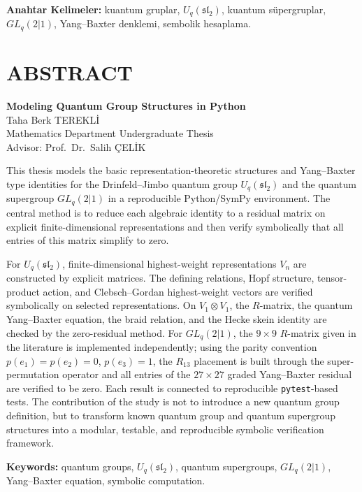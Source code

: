 \documentclass[12pt,a4paper,fleqn]{report}
\numberwithin{equation}{chapter}
\theoremstyle{plain}
\theoremstyle{definition}
\renewcommand{\sl}{\mathfrak{sl}}
\newcommand{\Uq}{U_q(\sl_2)}
\newcommand{\TezBaslikEn}{Modeling Quantum Group Structures in Python}
\newcommand{\Ogrenci}{Taha Berk TEREKLİ}
\newcommand{\Danisman}{Prof.\ Dr.\ Salih ÇELİK}
\begin{document}
\vspace{0.6cm}
\noindent\textbf{Anahtar Kelimeler:} kuantum gruplar, $U_q(\mathfrak{sl}_2)$,
kuantum süpergruplar, $GL_q(2|1)$, Yang--Baxter denklemi, sembolik hesaplama.
\clearpage

\chapter*{ABSTRACT}
\begin{center}
{\bfseries \TezBaslikEn}\\[4pt]
\Ogrenci\\[8pt]
Mathematics Department Undergraduate Thesis\\[6pt]
Advisor: \Danisman\\[10pt]
\end{center}

This thesis models the basic representation-theoretic structures and
Yang--Baxter type identities for the Drinfeld--Jimbo quantum group $\Uq$ and the
quantum supergroup $GL_q(2|1)$ in a reproducible Python/SymPy environment. The
central method is to reduce each algebraic identity to a residual matrix on
explicit finite-dimensional representations and then verify symbolically that
all entries of this matrix simplify to zero.

For $\Uq$, finite-dimensional highest-weight representations $V_n$ are
constructed by explicit matrices. The defining relations, Hopf structure,
tensor-product action, and Clebsch--Gordan highest-weight vectors are verified
symbolically on selected representations. On $V_1\otimes V_1$, the $R$-matrix,
the quantum Yang--Baxter equation, the braid relation, and the Hecke skein
identity are checked by the zero-residual method. For $GL_q(2|1)$, the
$9\times9$ $R$-matrix given in the literature is implemented independently;
using the parity convention $p(e_1)=p(e_2)=0$, $p(e_3)=1$, the $R_{13}$
placement is built through the super-permutation operator and all entries of the
$27\times27$ graded Yang--Baxter residual are verified to be zero. Each result is
connected to reproducible \texttt{pytest}-based tests. The contribution of the
study is not to introduce a new quantum group definition, but to transform known
quantum group and quantum supergroup structures into a modular, testable, and
reproducible symbolic verification framework.

\vspace{0.6cm}
\noindent\textbf{Keywords:} quantum groups, $U_q(\mathfrak{sl}_2)$, quantum
supergroups, $GL_q(2|1)$, Yang--Baxter equation, symbolic computation.
\clearpage

\setcounter{page}{1}
\end{document}
